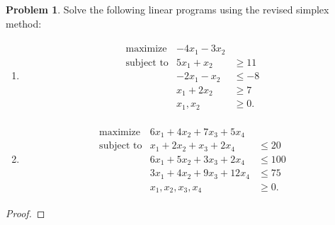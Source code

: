 \documentclass[12pt]{article}
\theoremstyle{definition}
\newtheorem{problem}{Problem}
\begin{document}
\begin{problem}
  Solve the following linear programs using the revised simplex method:
  \begin{enumerate}
    \item
      \begin{align*}
        \begin{array}{rrl}
          \text{maximize} & -4x_1 -3x_2 &\\
          \text{subject to} &5x_1 + x_2 &\geq 11 \\
          & -2x_1 - x_2 &\leq -8 \\
          & x_1 + 2x_2 &\geq 7 \\
          & x_1, x_2 &\geq 0.
        \end{array}
      \end{align*}
    \item
      \begin{align*}
        \begin{array}{rrl}
          \text{maximize} & 6x_1 + 4x_2 + 7x_3 + 5x_4  &\\
          \text{subject to}
          & x_1 + 2x_2 + x_3 + 2x_4 &\leq 20 \\
          & 6x_1 + 5x_2 + 3x_3 + 2x_4 &\leq 100 \\
          & 3x_1 + 4x_2 + 9x_3 + 12x_4 &\leq 75 \\
          & x_1, x_2, x_3, x_4 &\geq 0.
        \end{array}
      \end{align*}
  \end{enumerate}
\end{problem}

\begin{proof}
\end{proof}
\newpage
\end{document}
